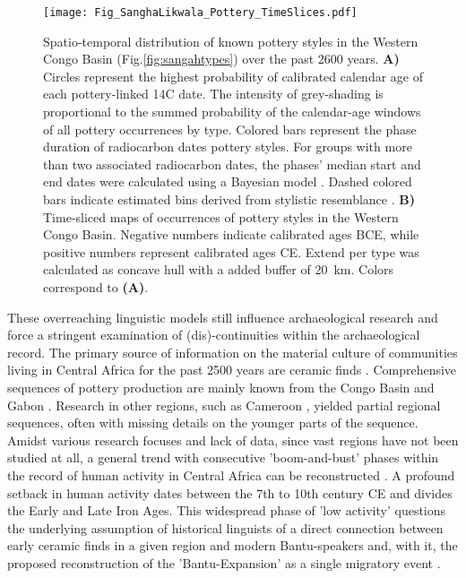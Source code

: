 \documentclass[smallextended,natbib]{svjour3}       %
\begin{document}
\begin{figure}[p]
	\centering
	\texttt{[image: Fig\_SanghaLikwala\_Pottery\_TimeSlices.pdf]}
	\caption{Spatio-temporal distribution of known pottery styles in the Western Congo Basin (Fig.\ref{fig:sangahtypes}) over the past 2600 years. \textbf{A)} Circles represent the highest probability of calibrated calendar age of each pottery-linked 14C date. The intensity of grey-shading is proportional to the summed probability of the calendar-age windows of all pottery occurrences by type. Colored bars represent the phase duration of radiocarbon dates pottery styles. For groups with more than two associated radiocarbon dates, the phases' median start and end dates were calculated using a Bayesian model \citep[Fig.~S1,Tab.~S1]{Crema.2021a,Crema.2021b,Seidensticker.2024}. Dashed colored bars indicate estimated bins derived from stylistic resemblance \citep[Data S2]{Seidensticker.2021}. \textbf{B)} Time-sliced maps of occurrences of pottery styles in the Western Congo Basin. Negative numbers indicate calibrated ages BCE, while positive numbers represent calibrated ages CE. Extend per type was calculated as concave hull \citep{Gombin.2017} with a added buffer of 20~km. Colors correspond to \textbf{(A)}.}
	\label{fig:timeslicemaps}
\end{figure}

These overreaching linguistic models still influence archaeological research \cite{Eggert.2005,Eggert.2012,Eggert.2016} and force a stringent examination of (dis)-continuities within the archaeological record. The primary source of information on the material culture of communities living in Central Africa for the past 2500 years are ceramic finds \cite{Eggert.2014}. Comprehensive sequences of pottery production are mainly known from the Congo Basin \citep{Wotzka.1995,Seidensticker.2021e} and Gabon \citep{Clist.20042005}. Research in other regions, such as Cameroon \citep{GouemGouem.20102011,NlendNlend.20132014}, yielded partial regional sequences, often with missing details on the younger parts of the sequence. Amidst various research focuses and lack of data, since vast regions have not been studied at all, a general trend with consecutive 'boom-and-bust' phases within the record of human activity in Central Africa can be reconstructed \citep{Oslisly.1998,Oslisly.2013,Oslisly.2013b,Saulieu.2017,deSaulieu.2021a,Seidensticker.2021}. A profound setback in human activity dates between the 7th to 10th century CE and divides the Early and Late Iron Ages. This widespread phase of 'low activity' \citep[Fig. 2]{Seidensticker.2021} questions the underlying assumption of historical linguists of a direct connection between early ceramic finds in a given region and modern Bantu-speakers \citep{Grollemund.2015,Bostoen.2015} and, with it, the proposed reconstruction of the 'Bantu-Expansion' as a single migratory event \citep{Currie.2013,Koile.2022,Grollemund.2023}.
\end{document}
